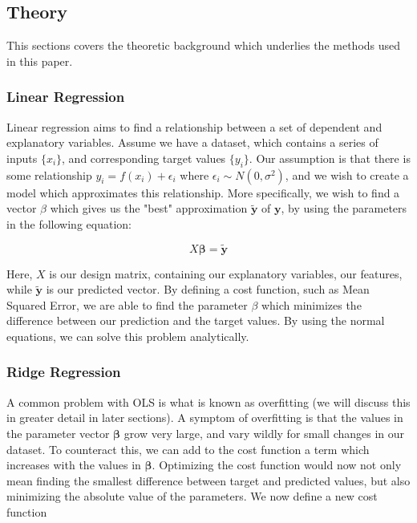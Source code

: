 \documentclass[onecolumn,10pt,cleanfoot]{asme2ej}
\begin{document}
\subsection{Theory}

This sections covers the theoretic background which underlies the methods used in this paper.

\subsubsection{Linear Regression}

Linear regression aims to find a relationship between a set of dependent and explanatory variables. Assume we have a dataset, which contains a series of inputs $\{x_i\}$, and corresponding target values $\{y_i\}$. Our assumption is that there is some relationship $y_i = f(x_i) + \epsilon_i$ where $\epsilon_i \sim N(0,\sigma^2)$, and we wish to create a model which approximates this relationship. More specifically, we wish to find a vector $\beta$ which gives us the "best" approximation $\bm{\tilde{y}}$ of $\bm{y}$, by using the parameters in the following equation:

\begin{equation}
X \bm{\beta} = \bm{\tilde{y}}
\label{first}
\end{equation}

Here, $X$ is our design matrix, containing our explanatory variables, our features, while $\bm{\tilde{y}}$ is our predicted vector. By defining a cost function, such as Mean Squared Error, we are able to find the parameter $\beta$ which minimizes the difference between our prediction and the target values. By using the normal equations, we can solve this problem analytically.

\subsubsection{Ridge Regression}

A common problem with OLS is what is known as overfitting (we will discuss this in greater detail in later sections). A symptom of overfitting is that the values in the parameter vector $\bm{\beta}$ grow very large, and vary wildly for small changes in our dataset. To counteract this, we can add to the cost function a term which increases with the values in $\bm{\beta}$. Optimizing the cost function would now not only mean finding the smallest difference between target and predicted values, but also minimizing the absolute value of the parameters. We now define a new cost function
\end{document}
